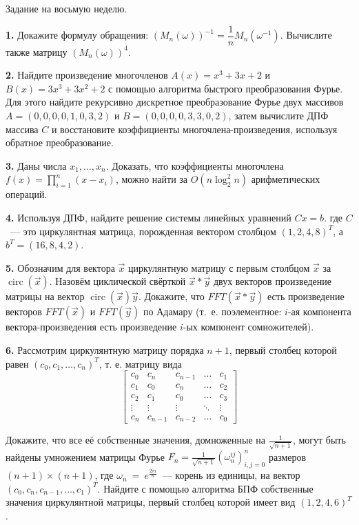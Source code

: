 \documentclass[12pt,a5paper,fleqn]{article}
\DeclareMathOperator{\circul}{circ}
\begin{document}
\begin{center}
{ \Large Задание на восьмую неделю.}

\end{center}



{\bf 1.} Докажите формулу обращения: $(M_n(\omega))^{-1} = \dfrac{1}{n}M_n(\omega^{-1})$. Вычислите также матрицу $(M_n(\omega))^4$.

\medskip

{\bf 2.} Найдите произведение многочленов $A(x) = x^3+3x+2$ и $B(x)=3x^3+3x^2+2$ с помощью алгоритма быстрого преобразования Фурье. Для этого найдите рекурсивно дискретное преобразование Фурье двух массивов $A=(0,0,0,0,1,0,3,2)$ и $B=(0,0,0,0,3,3,0,2)$, затем вычислите ДПФ массива $C$ и восстановите коэффициенты многочлена-произведения, используя обратное преобразование.
\medskip

{\bf 3.} Даны числа $x_1,\dotsc, x_n$. Доказать, что коэффициенты многочлена  $f(x) = \displaystyle\prod_{i = 1}^n (x-x_i)$, можно найти за $O(n \log_2^2 n)$ арифметических операций.


{\bf 4.}  Используя  ДПФ, найдите решение системы линейных уравнений $Cx=b$. где $C$~--- это циркулянтная матрица, порожденная вектором столбцом $(1,2,4,8)^T$, а $b^T=(16,8,4,2)$.

{\bf 5.} Обозначим для вектора $\vec{x}$ циркулянтную матрицу с первым столбцом $\vec{x}$ за $\circul(\vec{x})$. Назовём циклической свёрткой $\vec{x}*\vec{y}$ двух векторов произведение матрицы на вектор $\circul(\vec{x})\vec{y}$. Докажите, что $FFT(\vec{x}*\vec{y})$ есть произведение векторов $FFT(\vec{x})$ и $FFT(\vec{y})$ по Адамару (т.~е. поэлементное: $i$-ая компонента вектора-произведения есть произведение $i$-ых компонент сомножителей).
  
{\bf 6.} Рассмотрим циркулянтную матрицу порядка $n+1$, первый столбец которой равен $(c_0, c_1, \dotsc, c_n)^T$, т. е. матрицу вида
$$\begin{bmatrix}
c_0 & c_n & c_{n-1} & \dots & c_1 \\
c_1 & c_0 & c_n & \dots & c_2 \\ 
c_2 & c_1 & c_0 & \dots & c_3 \\ 
\vdots & \vdots & \vdots & \ddots & \vdots \\ 
c_n & c_{n-1} & c_{n-2} & \dots & c_0 \end{bmatrix}$$

Докажите, что все её собственные значения, домноженные на $\frac{1}{\sqrt{n+1}}$, могут быть найдены умножением матрицы Фурье $F_n = \frac{1}{\sqrt{n+1}}\left(\omega_n^{ij}\right)_{i, j = 0}^{n}$ размеров $(n+1)\times (n+1)$, где $\omega_n~=~e^{\frac{2\pi i}{n}}$~--- корень из единицы, на вектор $(c_0, c_n, c_{n-1},\dotsc, c_1)^T$. Найдите с помощью алгоритма БПФ собственные значения циркулянтной матрицы, первый столбец которой имеет вид $(1, 2, 4, 6)^T$.
\end{document}
